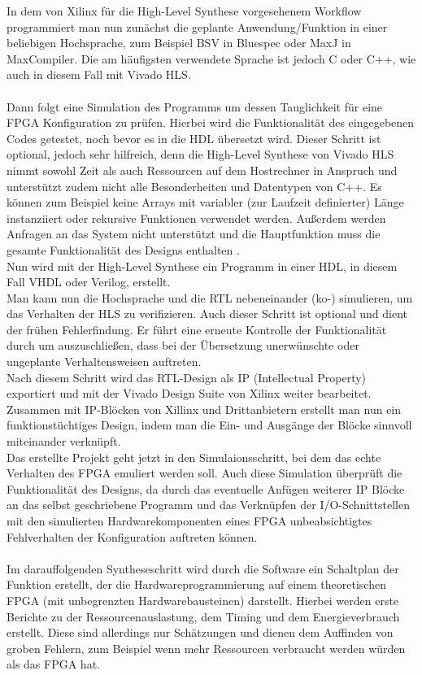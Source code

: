 In dem von Xilinx für die High-Level Synthese vorgesehenem Workflow programmiert man nun zunächst die geplante Anwendung/Funktion in einer beliebigen Hochsprache, zum Beispiel BSV in Bluespec oder MaxJ in MaxCompiler. Die am häufigsten verwendete Sprache ist jedoch C oder C++, wie auch in diesem Fall mit Vivado HLS\cite{NASI}.\\\\ Dann folgt eine Simulation des Programms um dessen Tauglichkeit für eine FPGA Konfiguration zu prüfen. Hierbei wird die Funktionalität des eingegebenen Codes getestet, noch bevor es in die HDL übersetzt wird. Dieser Schritt ist optional, jedoch sehr hilfreich, denn die High-Level Synthese von Vivado HLS nimmt sowohl Zeit als auch Ressourcen auf dem Hostrechner in Anspruch und unterstützt zudem nicht alle Besonderheiten und Datentypen von C++. Es können zum Beispiel keine Arrays mit variabler (zur Laufzeit definierter) Länge instanziiert oder rekursive Funktionen verwendet werden. Außerdem werden Anfragen an das System nicht unterstützt und die Hauptfunktion muss die gesamte Funktionalität des Designs enthalten \cite{XIL2}.\\Nun wird mit der High-Level Synthese ein Programm in einer HDL, in diesem Fall VHDL oder Verilog, erstellt.\\
Man kann nun die Hochsprache und die RTL nebeneinander (ko-) simulieren, um das Verhalten der HLS zu verifizieren. Auch dieser Schritt ist optional und dient der frühen Fehlerfindung. Er führt eine erneute Kontrolle der Funktionalität durch um auszuschließen, dass bei der Übersetzung unerwünschte oder ungeplante Verhaltensweisen auftreten. \\
Nach diesem Schritt wird das RTL-Design als IP (Intellectual Property) exportiert und mit der Vivado Design Suite von Xilinx weiter bearbeitet. Zusammen mit IP-Blöcken von Xillinx und Drittanbietern erstellt man nun ein funktionstüchtiges Design, indem man die Ein- und Ausgänge der Blöcke sinnvoll miteinander verknüpft.\\ Das erstellte Projekt geht jetzt in den Simulaionsschritt, bei dem das echte Verhalten des FPGA emuliert werden soll. Auch diese Simulation überprüft die Funktionalität des Designs, da durch das eventuelle Anfügen weiterer IP Blöcke an das selbst geschriebene Programm und das Verknüpfen der I/O-Schnittstellen mit den simulierten Hardwarekomponenten eines FPGA unbeabsichtigtes Fehlverhalten der Konfiguration auftreten können.\\\\ Im darauffolgenden Syntheseschritt wird durch die Software ein Schaltplan der Funktion erstellt, der die Hardwareprogrammierung auf einem theoretischen FPGA (mit unbegrenzten Hardwarebausteinen) darstellt. Hierbei werden erste Berichte zu der Ressourcenauslastung, dem Timing und dem Energieverbrauch erstellt. Diese sind allerdings nur Schätzungen und dienen dem Auffinden von groben Fehlern, zum Beispiel wenn mehr Ressourcen verbraucht werden würden als das FPGA hat.\\
